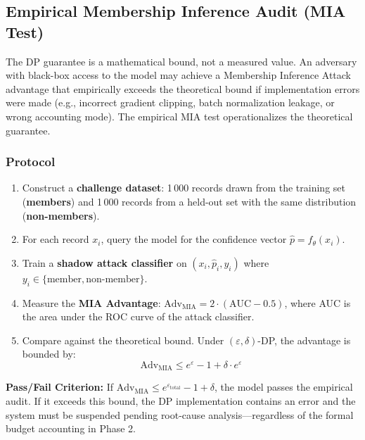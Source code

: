 \subsection{Empirical Membership Inference Audit (MIA Test)}
\label{subsec:mia_audit}

The DP guarantee is a mathematical bound, not a measured value. An adversary with black-box access to the model may achieve a Membership Inference Attack advantage that empirically exceeds the theoretical bound if implementation errors were made (e.g., incorrect gradient clipping, batch normalization leakage, or wrong accounting mode). The empirical MIA test operationalizes the theoretical guarantee.

\subsubsection*{Protocol}

\begin{enumerate}
  \item Construct a \textbf{challenge dataset}: 1\,000 records drawn from the training set (\textbf{members}) and 1\,000 records from a held-out set with the same distribution (\textbf{non-members}).
  \item For each record $x_i$, query the model for the confidence vector $\hat{p} = f_\theta(x_i)$.
  \item Train a \textbf{shadow attack classifier} on $(x_i, \hat{p}_i, y_i)$ where $y_i \in \{\text{member}, \text{non-member}\}$.
  \item Measure the \textbf{MIA Advantage}: $\mathrm{Adv}_{\text{MIA}} = 2 \cdot (\mathrm{AUC} - 0.5)$, where AUC is the area under the ROC curve of the attack classifier.
  \item Compare against the theoretical bound. Under $(\varepsilon, \delta)$-DP, the advantage is bounded by:
\begin{equation}
  \mathrm{Adv}_{\text{MIA}} \leq e^\varepsilon - 1 + \delta \cdot e^\varepsilon
  \label{eq:mia_bound}
\end{equation}
\end{enumerate}

\begin{svgraybox}
\textbf{Pass/Fail Criterion:} If $\mathrm{Adv}_{\text{MIA}} \leq e^{\varepsilon_{\text{total}}} - 1 + \delta$, the model passes the empirical audit. If it exceeds this bound, the DP implementation contains an error and the system must be suspended pending root-cause analysis---regardless of the formal budget accounting in Phase 2.
\end{svgraybox}

